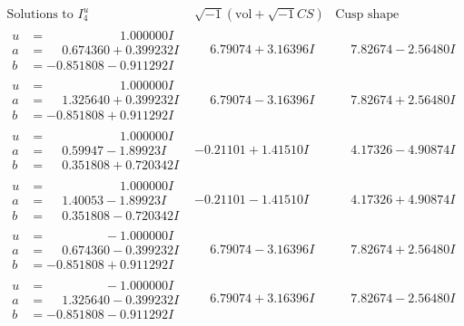 \documentclass[1p]{elsarticle_modified}
\theoremstyle{definition}
\newcommand{\I}{\sqrt{-1}}
\begin{document}
$$\begin{array}{c|c|c}  
\text{Solutions to }I^u_{4}& \I (\text{vol} + \sqrt{-1}CS) & \text{Cusp shape}\\
 \hline 
\begin{aligned}
u &= \phantom{-0.000000 -}1.000000 I \\
a &= \phantom{-}0.674360 + 0.399232 I \\
b &= -0.851808 - 0.911292 I\end{aligned}
 & \phantom{-}6.79074 + 3.16396 I & \phantom{-}7.82674 - 2.56480 I \\ \hline\begin{aligned}
u &= \phantom{-0.000000 -}1.000000 I \\
a &= \phantom{-}1.325640 + 0.399232 I \\
b &= -0.851808 + 0.911292 I\end{aligned}
 & \phantom{-}6.79074 - 3.16396 I & \phantom{-}7.82674 + 2.56480 I \\ \hline\begin{aligned}
u &= \phantom{-0.000000 -}1.000000 I \\
a &= \phantom{-}0.59947 - 1.89923 I \\
b &= \phantom{-}0.351808 + 0.720342 I\end{aligned}
 & -0.21101 + 1.41510 I & \phantom{-}4.17326 - 4.90874 I \\ \hline\begin{aligned}
u &= \phantom{-0.000000 -}1.000000 I \\
a &= \phantom{-}1.40053 - 1.89923 I \\
b &= \phantom{-}0.351808 - 0.720342 I\end{aligned}
 & -0.21101 - 1.41510 I & \phantom{-}4.17326 + 4.90874 I \\ \hline\begin{aligned}
u &= \phantom{-0.000000 } -1.000000 I \\
a &= \phantom{-}0.674360 - 0.399232 I \\
b &= -0.851808 + 0.911292 I\end{aligned}
 & \phantom{-}6.79074 - 3.16396 I & \phantom{-}7.82674 + 2.56480 I \\ \hline\begin{aligned}
u &= \phantom{-0.000000 } -1.000000 I \\
a &= \phantom{-}1.325640 - 0.399232 I \\
b &= -0.851808 - 0.911292 I\end{aligned}
 & \phantom{-}6.79074 + 3.16396 I & \phantom{-}7.82674 - 2.56480 I \\ \hline\begin{aligned}

\end{aligned}
\end{array}$$
\end{document}
